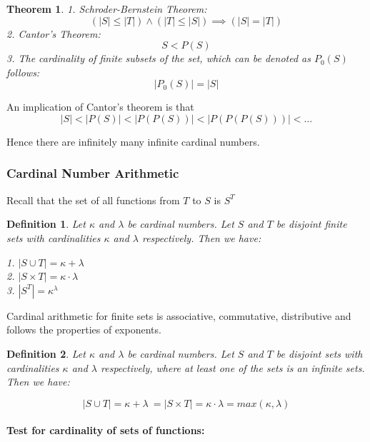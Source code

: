 \documentclass [12pt]{article}
\newtheorem {theorem}{Theorem}
\newtheorem {definition}{Definition}
\begin{document}
\begin {theorem}
 1. Schroder-Bernstein Theorem: 
\[(|S|\leq |T|)\land (|T|\leq |S|)\implies (|S|=|T|) \]
 2. Cantor's Theorem: 
\[S<P(S) \]
 3. The cardinality of finite subsets of the set, which can be denoted as
$P_{0}(S)$ follows: 
\[|P_{0}(S)|=|S| \]
 
\end {theorem}
 

An implication of Cantor's theorem is that 
\[|S|<|P(S)|<|P(P(S))|<|P(P(P(S)))|<\ldots  \]
 

Hence there are infinitely many infinite cardinal numbers. 


\subsubsection {Cardinal Number Arithmetic} 

Recall that the set of all functions from $T$ to $S$ is $S^T$ 

\begin {definition}
 Let $\kappa $ and $\lambda $ be cardinal numbers. Let $S$ and $T$ be disjoint
finite sets with cardinalities $\kappa $ and $\lambda $ respectively. Then
we have: 

1. $|S\cup T|=\kappa +\lambda $\\
2. $|S\times T|=\kappa \cdot \lambda $\\
3. $|S^{T}|=\kappa ^{\lambda }$\\
\end {definition}
 

Cardinal arithmetic for finite sets is associative, commutative, distributive
and follows the properties of exponents. 

\begin {definition}
 Let $\kappa $ and $\lambda $ be cardinal numbers. Let $S$ and $T$ be disjoint
sets with cardinalities $\kappa $ and $\lambda $ respectively, where at
least one of the sets is an infinite sets. Then we have: 

\[|S\cup T|=\kappa +\lambda \ =|S\times T|=\kappa \cdot \lambda =max(\kappa ,\lambda )
\]
 
\end {definition}
 


\paragraph {Test for cardinality of sets of functions:} 
\end{document}
